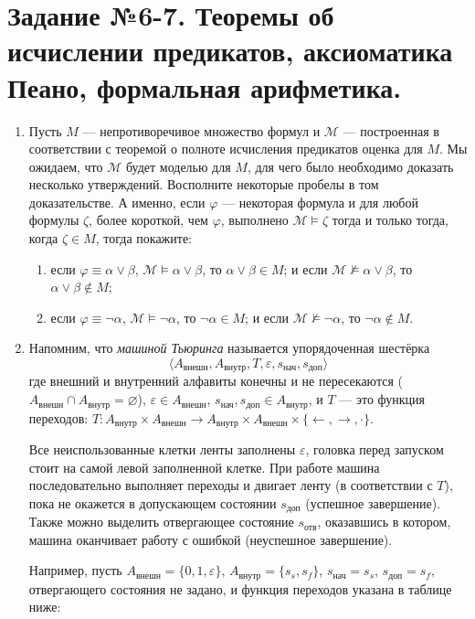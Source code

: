 \documentclass[10pt,a4paper,oneside]{article}
\begin{document}
\section*{Задание №6-7. Теоремы об исчислении предикатов, аксиоматика Пеано, формальная арифметика.}
\begin{enumerate}
\item Пусть $M$ --- непротиворечивое множество формул и $\mathcal{M}$ --- построенная в соответствии с теоремой о 
полноте исчисления предикатов оценка для $M$. Мы ожидаем, что $\mathcal{M}$ будет моделью для $M$, для чего было необходимо доказать
несколько утверждений. Восполните некоторые пробелы в том доказательстве. А именно, если $\varphi$ --- 
некоторая формула и для любой формулы $\zeta$, более короткой, чем $\varphi$, выполнено
$\mathcal{M}\models\zeta$ тогда и только тогда, когда $\zeta\in M$, тогда покажите:
\begin{enumerate}
\item если $\varphi \equiv \alpha\vee\beta$, $\mathcal{M}\models\alpha\vee\beta$, то $\alpha\vee\beta\in M$; и если $\mathcal{M}\not\models\alpha\vee\beta$, то $\alpha\vee\beta\notin M$;
\item если $\varphi \equiv \neg\alpha$, $\mathcal{M}\models\neg\alpha$, то $\neg\alpha\in M$; и если $\mathcal{M}\not\models\neg\alpha$, то $\neg\alpha\notin M$.
\end{enumerate}

\item 
Напомним, что \emph{машиной Тьюринга} называется упорядоченная шестёрка $$\langle A_\text{внешн}, A_\text{внутр}, T, \varepsilon, s_\text{нач}, s_\text{доп}\rangle$$
где внешний и внутренний алфавиты конечны и не пересекаются ($A_\text{внешн} \cap A_\text{внутр} = \varnothing$), $\varepsilon \in A_\text{внешн}$, $s_\text{нач}, s_\text{доп} \in A_\text{внутр}$, 
и $T$ --- это функция переходов: $T : A_\text{внутр} \times A_\text{внешн} \rightarrow A_\text{внутр} \times A_\text{внешн} \times \{ \leftarrow, \rightarrow, \cdot \}$.

Все неиспользованные клетки ленты заполнены $\varepsilon$, головка перед запуском стоит на самой левой заполненной клетке.
При работе машина последовательно выполняет переходы и двигает ленту (в соответствии с $T$), пока не окажется в 
допускающем состоянии $s_\text{доп}$ (успешное завершение). Также можно выделить отвергающее состояние $s_\text{отв}$, 
оказавшись в котором, машина оканчивает работу с ошибкой (неуспешное завершение).

Например, пусть $A_\text{внешн} = \{ 0, 1, \varepsilon \}$, $A_\text{внутр} = \{s_s, s_f\}$, $s_\text{нач} = s_s$, $s_\text{доп} = s_f$,
отвергающего состояния не задано, и функция переходов указана в таблице ниже:


\end{enumerate}
\end{document}
